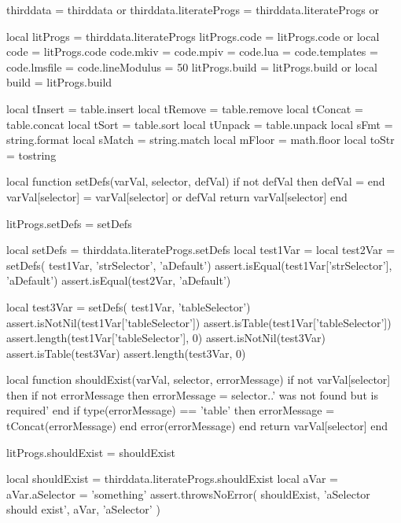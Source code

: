 thirddata               = thirddata               or {}
thirddata.literateProgs = thirddata.literateProgs or {}

local litProgs   = thirddata.literateProgs
litProgs.code    = litProgs.code or {}
local code       = litProgs.code
code.mkiv        = {}
code.mpiv        = {}
code.lua         = {}
code.templates   = {}
code.lmsfile     = {}
code.lineModulus = 50
litProgs.build   = litProgs.build or {}
local build      = litProgs.build

local tInsert = table.insert
local tRemove = table.remove
local tConcat = table.concat
local tSort   = table.sort
local tUnpack = table.unpack
local sFmt    = string.format
local sMatch  = string.match
local mFloor  = math.floor
local toStr   = tostring
\stopLuaCode

\startTestSuite[setDefs]

\startLuaCode
local function setDefs(varVal, selector, defVal)
  if not defVal then defVal = { } end
  varVal[selector] = varVal[selector] or defVal
  return varVal[selector]
end

litProgs.setDefs = setDefs
\stopLuaCode

\startLuaTest
  local setDefs = thirddata.literateProgs.setDefs
  local test1Var = { }
  local test2Var = setDefs( test1Var, 'strSelector', 'aDefault')
  assert.isEqual(test1Var['strSelector'], 'aDefault')
  assert.isEqual(test2Var, 'aDefault')

  local test3Var = setDefs( test1Var, 'tableSelector')
  assert.isNotNil(test1Var['tableSelector'])
  assert.isTable(test1Var['tableSelector'])
  assert.length(test1Var['tableSelector'], 0)
  assert.isNotNil(test3Var)
  assert.isTable(test3Var)
  assert.length(test3Var, 0)
\stopLuaTest
\stopTestCase
\stopTestSuite

\startTestSuite[shouldExist]

\startLuaCode
local function shouldExist(varVal, selector, errorMessage)
  if not varVal[selector] then
    if not errorMessage then
      errorMessage = selector..' was not found but is required'
    end
    if type(errorMessage) == 'table' then
      errorMessage = tConcat(errorMessage)
    end
    error(errorMessage)
  end
  return varVal[selector]
end

litProgs.shouldExist = shouldExist

\stopLuaCode

\startLuaTest
  local shouldExist = thirddata.literateProgs.shouldExist
  local aVar = { }
  aVar.aSelector = 'something'
  assert.throwsNoError(
    shouldExist,
    'aSelector should exist',
    aVar,
    'aSelector'
  )
\stopLuaTest
\stopTestCase

